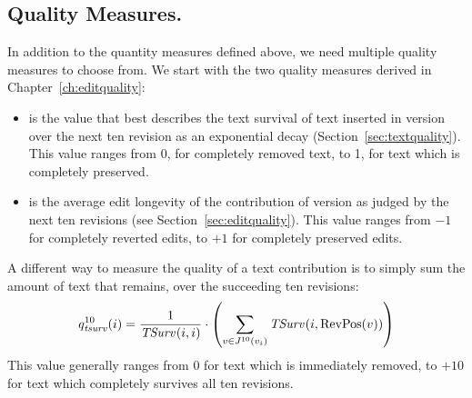 \subsection{Quality Measures.}

In addition to the quantity measures defined above, we need
multiple quality measures to choose from.
We start with the two quality measures derived in
Chapter~\ref{ch:editquality}:
\begin{itemize}
\item {} is the value that best describes
    the text survival of text inserted in version 
    over the next ten revision as an exponential
    decay (Section~\ref{sec:textquality}).
    This value ranges from 0, for completely removed text,
    to 1, for text which is completely preserved.
\item {} is the average edit longevity of
    the contribution of version  as judged by the
    next ten revisions (see Section~\ref{sec:editquality}).
    This value ranges from $-1$ for completely reverted edits,
    to $+1$ for completely preserved edits.
\end{itemize}

A different way to measure the quality of a text contribution
is to simply sum the amount of text that remains, over the
succeeding ten revisions:
%
\begin{equation*}
    \quality{tsurv}{10}{i} = \frac{1}{\tsurv{}{i,i}} \cdot
    \left( \sum_{v \in \judges{}{10}{\version{i}}} \tsurv{}{i,\revpos{v}} \right)
\end{equation*}
%
This value generally ranges from $0$ for text which is immediately removed,
to $+10$ for text which completely survives all ten revisions.

